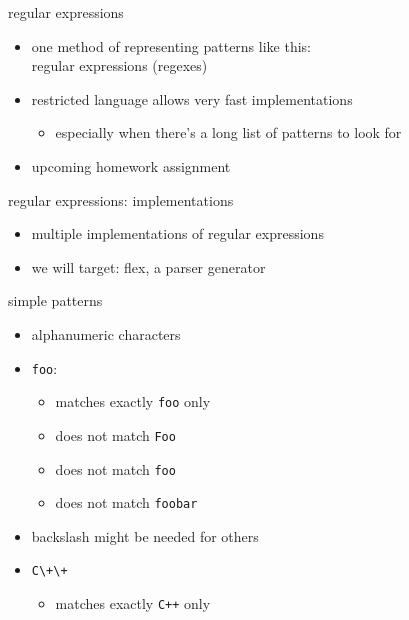 
\begin{frame}{regular expressions}
    \begin{itemize}
    \item one method of representing patterns like this: \\
          regular expressions (regexes)
    \item restricted language allows very fast implementations
        \begin{itemize}
        \item especially when there's a long list of patterns to look for
        \end{itemize}
    \item upcoming homework assignment
    \end{itemize}
\end{frame}

\begin{frame}{regular expressions: implementations}
    \begin{itemize}
    \item multiple implementations of regular expressions
    \item we will target: flex, a parser generator
    \end{itemize}
\end{frame}

\begin{frame}[fragile,label=simplePat]{simple patterns}
    \begin{itemize}
    \item alphanumeric characters 
    \item {\tt foo}:
        \begin{itemize}
        \item matches exactly {\tt foo} only
        \item does not match {\tt Foo}
        \item does not match {\tt foo\textvisiblespace}
        \item does not match {\tt foobar}
        \end{itemize}
    \item backslash might be needed for others
    \item \verb|C\+\+|
        \begin{itemize}
        \item matches exactly {\tt C++} only
        \end{itemize}
    \end{itemize}
\end{frame}

